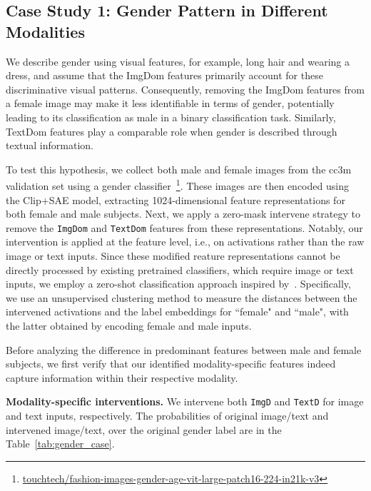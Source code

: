 \subsection{Case Study 1: Gender Pattern in Different Modalities}
We describe gender using visual features, for example, long hair and wearing a dress, and assume that the ImgDom features primarily account for these discriminative visual patterns. Consequently, removing the ImgDom features from a female image may make it  less identifiable in terms of gender, potentially leading to its classification as male in a binary classification task. Similarly, TextDom features play a comparable role when gender is described through textual information. 

To test this hypothesis, we collect both male and female images from the cc3m validation set using a gender classifier~\footnote{\href{https://huggingface.co/touchtech/fashion-images-gender-age-vit-large-patch16-224-in21k-v3}{touchtech/fashion-images-gender-age-vit-large-patch16-224-in21k-v3}}. These images are then encoded using the Clip+SAE model, extracting 1024-dimensional feature representations for both female and male subjects. Next, we apply a zero-mask  intervene strategy to remove the \texttt{ImgDom} and \texttt{TextDom} features from these representations. Notably, our intervention is applied at the feature level, i.e., on activations rather than the raw image or text inputs. Since these modified reature representations cannot be directly processed by existing pretrained classifiers, which require image or text inputs, we employ a zero-shot classification approach inspired by~\citet{bhalla2024interpreting}. Specifically, we use an unsupervised clustering method to measure the distances between the intervened activations and the label embeddings for ``female" and ``male", with the latter obtained by encoding female and male inputs. 

Before analyzing the difference in predominant features between male and female subjects, we first  verify that our identified modality-specific features indeed capture information within their respective  modality. 

\textbf{Modality-specific interventions.} We intervene both \texttt{ImgD} and \texttt{TextD} for image and text inputs, respectively. The probabilities of original image/text and intervened image/text, over the original gender label are in the Table~\ref{tab:gender_case}. 


